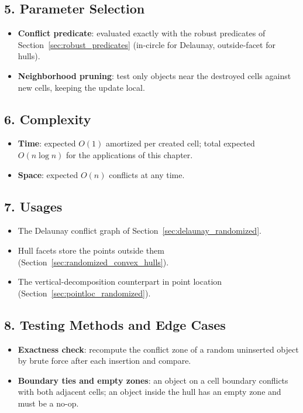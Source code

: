 \subsection{5. Parameter Selection}

\begin{itemize}
\item \textbf{Conflict predicate}: evaluated exactly with the robust predicates
  of Section~\ref{sec:robust_predicates} (in-circle for Delaunay, outside-facet
  for hulls).
\item \textbf{Neighborhood pruning}: test only objects near the destroyed cells
  against new cells, keeping the update local.
\end{itemize}

\subsection{6. Complexity}

\begin{itemize}
\item \textbf{Time}: expected $O(1)$ amortized per created cell; total expected
  $O(n \log n)$ for the applications of this chapter.
\item \textbf{Space}: expected $O(n)$ conflicts at any time.
\end{itemize}

\subsection{7. Usages}

\begin{itemize}
\item The Delaunay conflict graph of Section~\ref{sec:delaunay_randomized}.
\item Hull facets store the points outside them
  (Section~\ref{sec:randomized_convex_hulls}).
\item The vertical-decomposition counterpart in point location
  (Section~\ref{sec:pointloc_randomized}).
\end{itemize}

\subsection{8. Testing Methods and Edge Cases}

\begin{itemize}
\item \textbf{Exactness check}: recompute the conflict zone of a random
  uninserted object by brute force after each insertion and compare.
\item \textbf{Boundary ties and empty zones}: an object on a cell boundary
  conflicts with both adjacent cells; an object inside the hull has an empty
  zone and must be a no-op.
\end{itemize}

